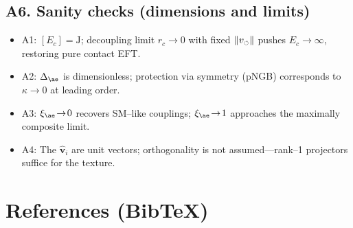 \documentclass[11pt]{article}
\begin{document}
  \subsection*{A6. Sanity checks (dimensions and limits)}
  \begin{itemize}
  \item A1: $[E_c]=\mathrm{J}$; decoupling limit $r_c\!\to\!0$ with fixed $\|\mathbf \mathbf{v}_{\scriptscriptstyle\boldsymbol{\circlearrowleft}}\|$ pushes $E_c\!\to\!\infty$, restoring pure contact EFT.
  \item A2: $\Delta_{\ae}$ is dimensionless; protection via symmetry (pNGB) corresponds to $\kappa\!\to\!0$ at leading order.
  \item A3: $\xi_{\ae}\!\to\!0$ recovers SM–like couplings; $\xi_{\ae}\!\to\!1$ approaches the maximally composite limit.
  \item A4: The $\hat{\mathbf v}_i$ are unit vectors; orthogonality is not assumed—rank–1 projectors suffice for the texture.
  \end{itemize}

  \section*{References (Bib\TeX)}
  \begin{verbatim}

  \end{verbatim}



  \ifdefined\standalonechapter\else
  
\end{document}
